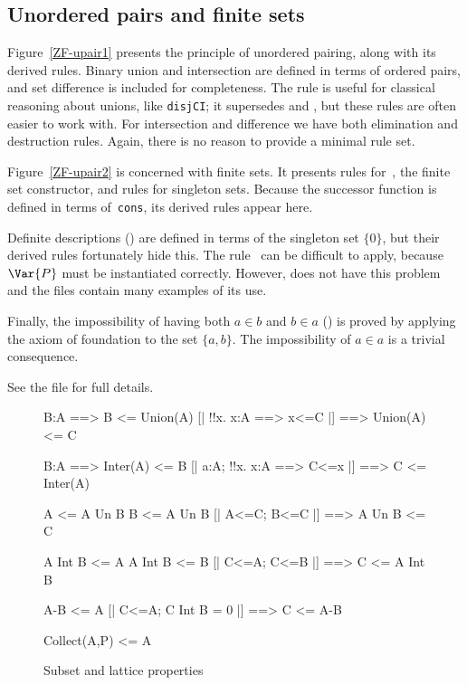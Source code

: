\subsection{Unordered pairs and finite sets}
Figure~\ref{ZF-upair1} presents the principle of unordered pairing, along
with its derived rules.  Binary union and intersection are defined in terms
of ordered pairs, and set difference is included for completeness.  The
rule  is useful for classical reasoning about unions,
like {\tt disjCI}\@; it supersedes  and
, but these rules are often easier to work with.  For
intersection and difference we have both elimination and destruction rules.
Again, there is no reason to provide a minimal rule set.

Figure~\ref{ZF-upair2} is concerned with finite sets.  It presents rules
for~, the finite set constructor, and rules for singleton
sets.  Because the successor function is defined in terms of~{\tt cons},
its derived rules appear here.

Definite descriptions () are defined in terms of the singleton
set $\{0\}$, but their derived rules fortunately hide this.  The
rule~ can be difficult to apply, because $\Var{P}$ must be
instantiated correctly.  However,  does not have this
problem and the files contain many examples of its use.

Finally, the impossibility of having both $a\in b$ and $b\in a$
() is proved by applying the axiom of foundation to
the set $\{a,b\}$.  The impossibility of $a\in a$ is a trivial consequence.

See the file  for full details.



\begin{figure}
\begin{ttbox}
       B:A ==> B <= Union(A)
       [| !!x. x:A ==> x<=C |] ==> Union(A) <= C

       B:A ==> Inter(A) <= B
    [| a:A;  !!x. x:A ==> C<=x |] ==> C <= Inter(A)

         A <= A Un B
         B <= A Un B
          [| A<=C;  B<=C |] ==> A Un B <= C

        A Int B <= A
        A Int B <= B
      [| C<=A;  C<=B |] ==> C <= A Int B

       A-B <= A
     [| C<=A;  C Int B = 0 |] ==> C <= A-B

    Collect(A,P) <= A
\end{ttbox}
\caption{Subset and lattice properties} \label{ZF-subset}
\end{figure}


